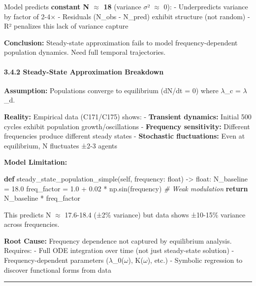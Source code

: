 \documentclass[
]{article}
\newenvironment{Shaded}{}{}
\newcommand{\BuiltInTok}[1]{\textcolor[rgb]{0.00,0.50,0.00}{#1}}
\newcommand{\CommentTok}[1]{\textcolor[rgb]{0.38,0.63,0.69}{\textit{#1}}}
\newcommand{\ControlFlowTok}[1]{\textcolor[rgb]{0.00,0.44,0.13}{\textbf{#1}}}
\newcommand{\FloatTok}[1]{\textcolor[rgb]{0.25,0.63,0.44}{#1}}
\newcommand{\KeywordTok}[1]{\textcolor[rgb]{0.00,0.44,0.13}{\textbf{#1}}}
\newcommand{\NormalTok}[1]{#1}
\newcommand{\OperatorTok}[1]{\textcolor[rgb]{0.40,0.40,0.40}{#1}}
\newcommand{\VariableTok}[1]{\textcolor[rgb]{0.10,0.09,0.49}{#1}}
\begin{document}
Model predicts \textbf{constant N $\approx$ 18} (variance $\sigma$² $\approx$ 0): -
Underpredicts variance by factor of 2-4× - Residuals (N\_obs - N\_pred)
exhibit structure (not random) - R² penalizes this lack of variance
capture

\textbf{Conclusion:} Steady-state approximation fails to model
frequency-dependent population dynamics. Need full temporal
trajectories.

\paragraph{3.4.2 Steady-State Approximation
Breakdown}\label{steady-state-approximation-breakdown}

\textbf{Assumption:} Populations converge to equilibrium (dN/dt = 0)
where $\lambda$\_c = $\lambda$\_d.

\textbf{Reality:} Empirical data (C171/C175) shows: - \textbf{Transient
dynamics:} Initial 500 cycles exhibit population growth/oscillations -
\textbf{Frequency sensitivity:} Different frequencies produce different
steady states - \textbf{Stochastic fluctuations:} Even at equilibrium, N
fluctuates ±2-3 agents

\textbf{Model Limitation:}

\begin{Shaded}
\begin{Highlighting}[]
\KeywordTok{def}\NormalTok{ steady\_state\_population\_simple(}\VariableTok{self}\NormalTok{, frequency: }\BuiltInTok{float}\NormalTok{) }\OperatorTok{{-}\textgreater{}} \BuiltInTok{float}\NormalTok{:}
\NormalTok{    N\_baseline }\OperatorTok{=} \FloatTok{18.0}
\NormalTok{    freq\_factor }\OperatorTok{=} \FloatTok{1.0} \OperatorTok{+} \FloatTok{0.02} \OperatorTok{*}\NormalTok{ np.sin(frequency)  }\CommentTok{\# Weak modulation}
    \ControlFlowTok{return}\NormalTok{ N\_baseline }\OperatorTok{*}\NormalTok{ freq\_factor}
\end{Highlighting}
\end{Shaded}

This predicts N $\approx$ 17.6-18.4 (±2\% variance) but data shows ±10-15\%
variance across frequencies.

\textbf{Root Cause:} Frequency dependence not captured by equilibrium
analysis. Requires: - Full ODE integration over time (not just
steady-state solution) - Frequency-dependent parameters ($\lambda$\_0($\omega$), K($\omega$),
etc.) - Symbolic regression to discover functional forms from data

\begin{center}\rule{0.5\linewidth}{0.5pt}\end{center}
\end{document}
